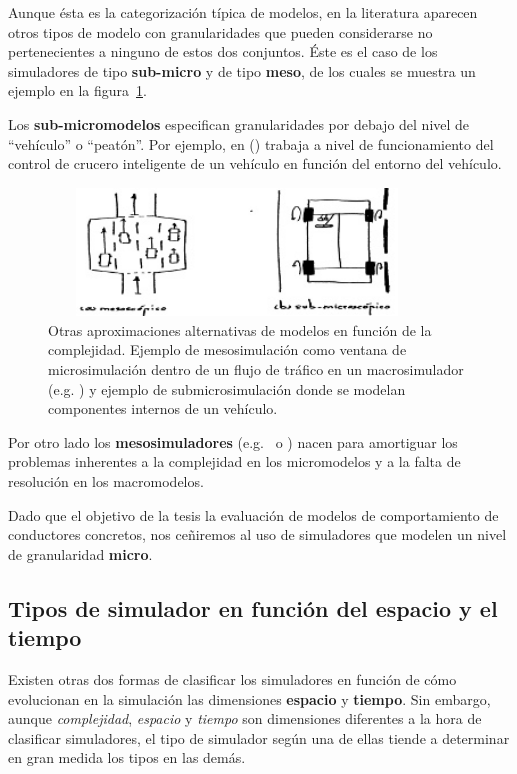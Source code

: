 Aunque ésta es la categorización típica de modelos, en la literatura aparecen otros tipos de modelo con granularidades que pueden considerarse no pertenecientes a ninguno de estos dos conjuntos. Éste es el caso de los simuladores de tipo \textbf{sub-micro} y de tipo \textbf{meso}, de los cuales se muestra un ejemplo en la figura~\ref{fig:mesoscopic-and-submicroscopic-simulation}.

Los \textbf{sub-micromodelos} especifican granularidades por debajo del nivel de \enquote{vehículo} o \enquote{peatón}. Por ejemplo, en (\cite{Minderhoud1999}) trabaja a nivel de funcionamiento del control de crucero inteligente de un vehículo en función del entorno del vehículo.

\begin{figure}
	\centering
	\includegraphics[width=10cm, height=3.4cm]{images/mesoscopic-and-submicroscopic-simulation}
	\caption{Otras aproximaciones alternativas de modelos en función de la complejidad. Ejemplo de mesosimulación como ventana de microsimulación dentro de un flujo de tráfico en un macrosimulador (e.g. \cite{munoz2001integrated}) y ejemplo de submicrosimulación donde se modelan componentes internos de un vehículo.}
	\label{fig:mesoscopic-and-submicroscopic-simulation}
\end{figure}

Por otro lado los \textbf{mesosimuladores} (e.g.~\cite{munoz2001integrated} o \cite{casas2011need}) nacen para amortiguar los problemas inherentes a la complejidad en los micromodelos y a la falta de resolución en los macromodelos.

Dado que el objetivo de la tesis la evaluación de modelos de comportamiento de conductores concretos, nos ceñiremos al uso de simuladores que modelen un nivel de granularidad \textbf{micro}.

\subsection{Tipos de simulador en función del espacio y el tiempo}

Existen otras dos formas de clasificar los simuladores en función de cómo evolucionan en la simulación las dimensiones \textbf{espacio} y  \textbf{tiempo}. Sin embargo, aunque \textit{complejidad}, \textit{espacio} y \textit{tiempo} son dimensiones diferentes a la hora de clasificar simuladores, el tipo de simulador según una de ellas tiende a determinar en gran medida los tipos en las demás.

